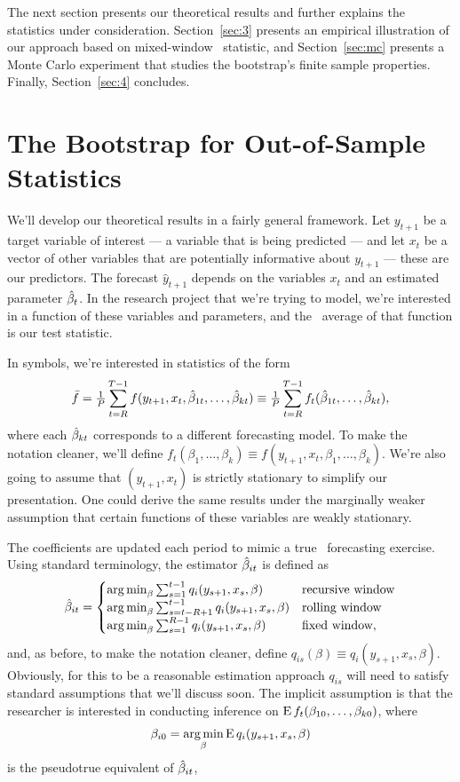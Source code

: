 \documentclass[12pt,fleqn]{article}
\begin{document}
The next section presents our theoretical results and further explains
the statistics under consideration. Section~\ref{sec:3} presents an
empirical illustration of our approach based on 
mixed-window \oos\ statistic, and Section~\ref{sec:mc} presents a
Monte Carlo experiment that studies the bootstrap's finite sample
properties. Finally, Section~\ref{sec:4} concludes.

\section{The Bootstrap for Out-of-Sample Statistics}

We'll develop our theoretical results in a fairly general
framework. Let $y_{t+1}$ be a target variable of interest --- a
variable that is being predicted --- and let $x_t$ be a vector of
other variables that are potentially informative about $y_{t+1}$ ---
these are our predictors. The forecast $\hat y_{t+1}$ depends on the
variables $x_t$ and an estimated parameter $\hat \beta_t$. In the research
project that we're trying to model, we're interested in a function of
these variables and parameters, and the \oos\ average of that function
is our test statistic.

In symbols, we're interested in statistics of the form
\begin{equation*}
  \bar f = \tfrac{1}{P} \sum_{t=R}^{T-1} f(y_{t+1}, x_t, \hat \beta_{1t},\dots,\hat \beta_{kt})
  \equiv \tfrac{1}{P} \sum_{t=R}^{T-1} f_t(\hat \beta_{1t},\dots,\hat \beta_{kt}),
\end{equation*}
where each $\hat \beta_{kt}$ corresponds to a different forecasting model.
To make the notation cleaner, we'll define $f_t(\beta_1,\dots,\beta_k)
\equiv f(y_{t+1}, x_t, \beta_1,\dots,\beta_k)$. We're also going to
assume that $(y_{t+1}, x_t)$ is strictly stationary to simplify our
presentation. One could derive the same results under the marginally
weaker assumption that certain functions of these variables are weakly
stationary.

The coefficients are updated each period to mimic a true \oos\
forecasting exercise.
Using standard terminology, the estimator $\hat \beta_{it}$ is defined as
\begin{equation}\label{eq:9}
  \hat\beta_{it} = \begin{cases}
    \operatorname*{arg\,min}_\beta \sum_{s=1}^{t-1} q_i(y_{s+1}, x_s, \beta) & \text{recursive window} \\
    \operatorname*{arg\,min}_\beta \sum_{s=t-R+1}^{t-1} q_i(y_{s+1}, x_s, \beta) & \text{rolling window} \\
    \operatorname*{arg\,min}_\beta \sum_{s=1}^{R-1} q_i(y_{s+1}, x_s, \beta) & \text{fixed window},
  \end{cases}
\end{equation}
and, as before, to make the notation cleaner, define $q_{is}(\beta)
\equiv q_i(y_{s+1},x_s,\beta)$. Obviously, for this to be a reasonable
estimation approach $q_{is}$ will need to satisfy standard assumptions
that we'll discuss soon. The implicit assumption is that the
researcher is interested in conducting inference on $\operatorname{E}
f_t(\beta_{10},\dots,\beta_{k0})$, where
\begin{equation*}
  \beta_{i0} = \operatorname*{arg\,min}_\beta \operatorname{E} q_i(y_{s+1}, x_s, \beta)
\end{equation*}
is the pseudotrue equivalent of $\hat \beta_{it}$,
\end{document}
